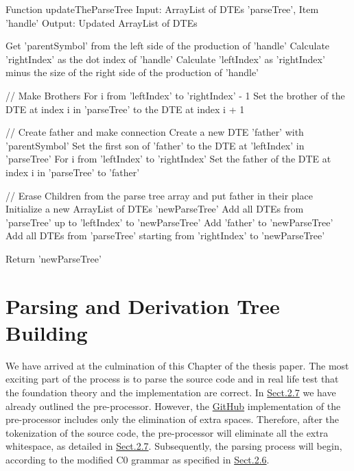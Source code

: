 \vspace{10pt}

\begin{codeblock}
    Function updateTheParseTree
    Input: ArrayList of DTEs 'parseTree', Item 'handle'
    Output: Updated ArrayList of DTEs

    Get 'parentSymbol' from the left side of the production of 'handle'
    Calculate 'rightIndex' as the dot index of 'handle'
    Calculate 'leftIndex' as 'rightIndex' minus the size of the right side of the production of 'handle'

    // Make Brothers
    For i from 'leftIndex' to 'rightIndex' - 1
    Set the brother of the DTE at index i in 'parseTree' to the DTE at index i + 1

    // Create father and make connection
    Create a new DTE 'father' with 'parentSymbol'
    Set the first son of 'father' to the DTE at 'leftIndex' in 'parseTree'
    For i from 'leftIndex' to 'rightIndex'
    Set the father of the DTE at index i in 'parseTree' to 'father'

    // Erase Children from the parse tree array and put father in their place
    Initialize a new ArrayList of DTEs 'newParseTree'
    Add all DTEs from 'parseTree' up to 'leftIndex' to 'newParseTree'
    Add 'father' to 'newParseTree'
    Add all DTEs from 'parseTree' starting from 'rightIndex' to 'newParseTree'

    Return 'newParseTree'
\end{codeblock}

\newpage


\section{Parsing and Derivation Tree Building}\label{sec:Parsing and Derivation Tree Building}

We have arrived at the culmination of this Chapter of the thesis paper. The most exciting part of the process is to parse the source code and in real life test that the foundation theory and the implementation are correct. In \hyperref[sec:Pre-processing for C0 Source Code]{Sect.2.7} we have already outlined the pre-processor. However, the \href{https://github.com/fyfsb/dcfg/}{GitHub} implementation of the pre-processor includes only the elimination of extra spaces. Therefore, after the tokenization of the source code, the pre-processor will eliminate all the extra whitespace, as detailed in \hyperref[sec:Pre-processing for C0 Source Code]{Sect.2.7}. Subsequently, the parsing process will begin, according to the modified C0 grammar as specified in \hyperref[sec:Analysis and Corrections of C0 Grammar based on DK1 Test]{Sect.2.6}.  \\

